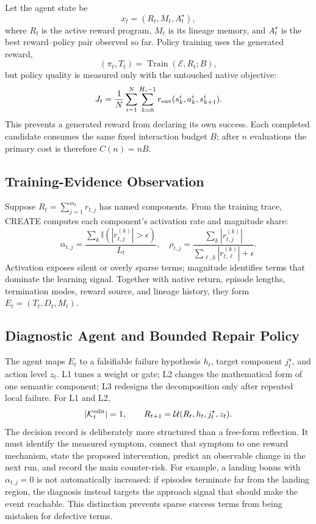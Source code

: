 \documentclass[conference]{IEEEtran}
\begin{document}
Let the agent state be
\begin{equation}
x_t=(R_t,M_t,A_t^\star),
\label{eq:state}
\end{equation}
where $R_t$ is the active reward program, $M_t$ is its lineage memory, and
$A_t^\star$ is the best reward--policy pair observed so far. Policy training
uses the generated reward,
\begin{equation}
(\pi_t,T_t)=\operatorname{Train}(\mathcal{E},R_t;B),
\label{eq:train}
\end{equation}
but policy quality is measured only with the untouched native objective:
\begin{equation}
J_t=\frac{1}{N}\sum_{i=1}^{N}\sum_{k=0}^{H_i-1}
r_{\rm env}(s_k^i,a_k^i,s_{k+1}^i).
\label{eq:native}
\end{equation}
This prevents a generated reward from declaring its own success. Each
completed candidate consumes the same fixed interaction budget $B$; after
$n$ evaluations the primary cost is therefore $C(n)=nB$.

\subsection{Training-Evidence Observation}
Suppose $R_t=\sum_{j=1}^{m_t}r_{t,j}$ has named components. From the training
trace, CREATE computes each component's activation rate and magnitude share:
\begin{equation}
\alpha_{t,j}=\frac{\sum_k\mathbb{I}(|r_{t,j}^{(k)}|>\epsilon)}{L_t},
\quad
\rho_{t,j}=\frac{\sum_k|r_{t,j}^{(k)}|}
{\sum_{\ell,k}|r_{t,\ell}^{(k)}|+\epsilon}.
\label{eq:evidence}
\end{equation}
Activation exposes silent or overly sparse terms; magnitude identifies terms
that dominate the learning signal. Together with native return, episode
lengths, termination modes, reward source, and lineage history, they form
$E_t=(T_t,D_t,M_t)$.

\subsection{Diagnostic Agent and Bounded Repair Policy}
The agent maps $E_t$ to a falsifiable failure hypothesis $h_t$, target
component $j_t^\star$, and action level $z_t$. L1 tunes a weight or gate; L2
changes the mathematical form of one semantic component; L3 redesigns the
decomposition only after repeated local failure. For L1 and L2,
\begin{equation}
|\mathcal{K}^{\rm edit}_t|=1,\qquad
R_{t+1}=\mathcal{U}(R_t,h_t,j_t^\star,z_t).
\label{eq:update}
\end{equation}
The decision record is deliberately more structured than a free-form
reflection. It must identify the measured symptom, connect that symptom to one
reward mechanism, state the proposed intervention, predict an observable
change in the next run, and record the main counter-risk. For example, a
landing bonus with $\alpha_{t,j}=0$ is not automatically increased: if
episodes terminate far from the landing region, the diagnosis instead targets
the approach signal that should make the event reachable. This distinction
prevents sparse success terms from being mistaken for defective terms.
\end{document}
